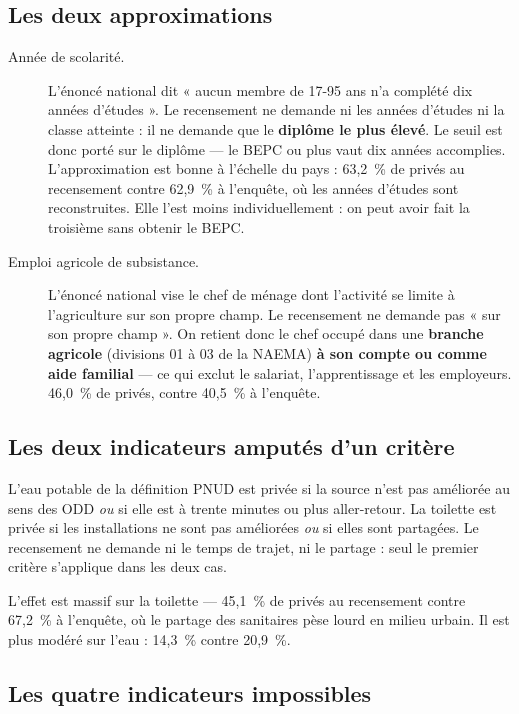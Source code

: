 \documentclass[11pt,a4paper]{article}
\begin{document}
\subsection{Les deux approximations}

\begin{description}
  \item[Année de scolarité.] L'énoncé national dit « aucun membre de 17-95 ans n'a complété dix
    années d'études ». Le recensement ne demande ni les années d'études ni la classe atteinte : il
    ne demande que le \textbf{diplôme le plus élevé}. Le seuil est donc porté sur le diplôme --- le
    BEPC ou plus vaut dix années accomplies. L'approximation est bonne à l'échelle du pays : 63,2~\%
    de privés au recensement contre 62,9~\% à l'enquête, où les années d'études sont reconstruites.
    Elle l'est moins individuellement : on peut avoir fait la troisième sans obtenir le BEPC.

  \item[Emploi agricole de subsistance.] L'énoncé national vise le chef de ménage dont l'activité se
    limite à l'agriculture sur son propre champ. Le recensement ne demande pas « sur son propre
    champ ». On retient donc le chef occupé dans une \textbf{branche agricole} (divisions 01 à 03 de
    la NAEMA) \textbf{à son compte ou comme aide familial} --- ce qui exclut le salariat,
    l'apprentissage et les employeurs. 46,0~\% de privés, contre 40,5~\% à l'enquête.
\end{description}

\subsection{Les deux indicateurs amputés d'un critère}

L'eau potable de la définition PNUD est privée si la source n'est pas améliorée au sens des ODD
\emph{ou} si elle est à trente minutes ou plus aller-retour. La toilette est privée si les
installations ne sont pas améliorées \emph{ou} si elles sont partagées. Le recensement ne demande
ni le temps de trajet, ni le partage : seul le premier critère s'applique dans les deux cas.

L'effet est massif sur la toilette --- 45,1~\% de privés au recensement contre 67,2~\% à l'enquête,
où le partage des sanitaires pèse lourd en milieu urbain. Il est plus modéré sur l'eau : 14,3~\%
contre 20,9~\%.

\subsection{Les quatre indicateurs impossibles}
\end{document}

